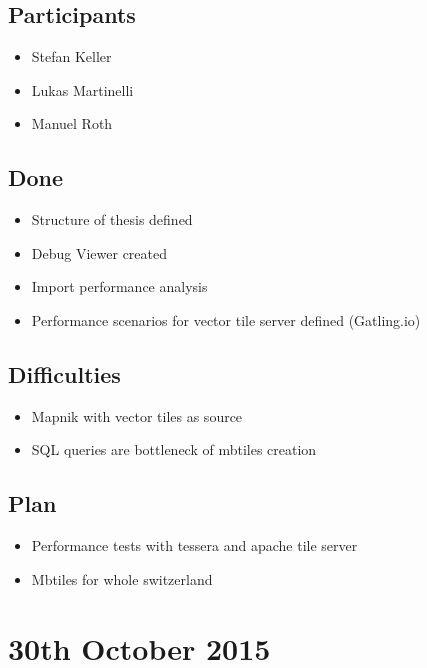\subsection*{Participants}

\begin{itemize}
  \item Stefan Keller
  \item Lukas Martinelli
  \item Manuel Roth
\end{itemize}


\subsection*{Done}

\begin{itemize}
  \item Structure of thesis defined
  \item Debug Viewer created
  \item Import performance analysis
  \item Performance scenarios for vector tile server defined (Gatling.io)
\end{itemize}

\subsection*{Difficulties}

\begin{itemize}
  \item Mapnik with vector tiles as source
  \item SQL queries are bottleneck of mbtiles creation
\end{itemize}

\subsection*{Plan}

\begin{itemize}
  \item Performance tests with tessera and apache tile server
  \item Mbtiles for whole switzerland
\end{itemize}

\section*{30th October 2015}

